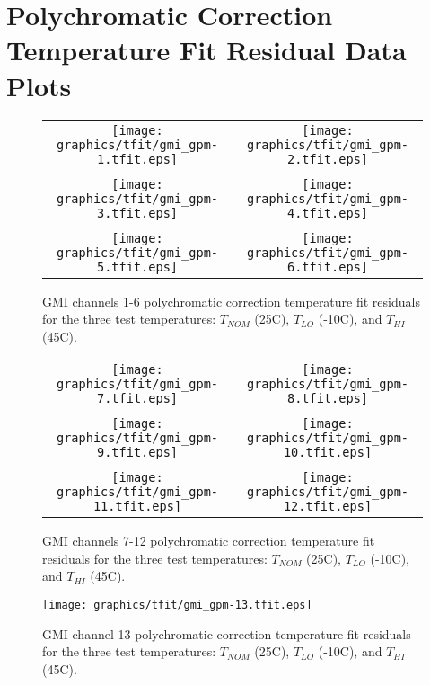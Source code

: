 \section{Polychromatic Correction Temperature Fit Residual Data Plots}
\label{app.tfit_data_plots}

\begin{figure}[H]
  \centering
  \begin{tabular}{c c}
    \texttt{[image: graphics/tfit/gmi\_gpm-1.tfit.eps]} &
    \texttt{[image: graphics/tfit/gmi\_gpm-2.tfit.eps]} \\\\
    \texttt{[image: graphics/tfit/gmi\_gpm-3.tfit.eps]} &
    \texttt{[image: graphics/tfit/gmi\_gpm-4.tfit.eps]} \\\\
    \texttt{[image: graphics/tfit/gmi\_gpm-5.tfit.eps]} &
    \texttt{[image: graphics/tfit/gmi\_gpm-6.tfit.eps]} \\
  \end{tabular}
  \caption{GMI channels 1-6 polychromatic correction temperature fit residuals for the three test temperatures: $T_{NOM}$ (25\textdegree{}C), $T_{LO}$ (-10\textdegree{}C), and $T_{HI}$ (45\textdegree{}C).}
  \label{fig:ch1-6_tfit}
\end{figure}

\begin{figure}[H]
  \centering
  \begin{tabular}{c c}
    \texttt{[image: graphics/tfit/gmi\_gpm-7.tfit.eps]} &
    \texttt{[image: graphics/tfit/gmi\_gpm-8.tfit.eps]} \\\\
    \texttt{[image: graphics/tfit/gmi\_gpm-9.tfit.eps]} &
    \texttt{[image: graphics/tfit/gmi\_gpm-10.tfit.eps]} \\\\
    \texttt{[image: graphics/tfit/gmi\_gpm-11.tfit.eps]} &
    \texttt{[image: graphics/tfit/gmi\_gpm-12.tfit.eps]} \\
  \end{tabular}
  \caption{GMI channels 7-12 polychromatic correction temperature fit residuals for the three test temperatures: $T_{NOM}$ (25\textdegree{}C), $T_{LO}$ (-10\textdegree{}C), and $T_{HI}$ (45\textdegree{}C).}
  \label{fig:ch7-12_tfit}
\end{figure}

\begin{figure}[H]
  \centering
  \texttt{[image: graphics/tfit/gmi\_gpm-13.tfit.eps]}
  \caption{GMI channel 13 polychromatic correction temperature fit residuals for the three test temperatures: $T_{NOM}$ (25\textdegree{}C), $T_{LO}$ (-10\textdegree{}C), and $T_{HI}$ (45\textdegree{}C).}
  \label{fig:ch13_tfit}
\end{figure}

